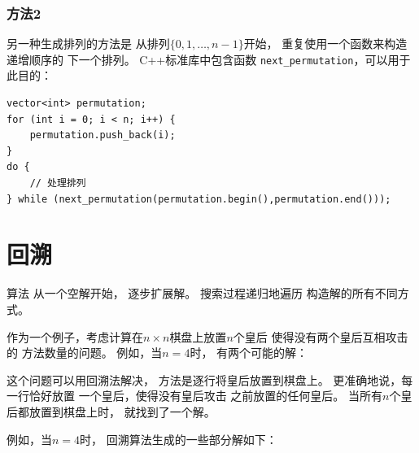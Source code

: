 \subsubsection{方法2}


另一种生成排列的方法是
从排列$\{0,1,\ldots,n-1\}$开始，
重复使用一个函数来构造递增顺序的
下一个排列。
C++标准库中包含函数
\texttt{next\_permutation}，可以用于此目的：

\begin{lstlisting}
vector<int> permutation;
for (int i = 0; i < n; i++) {
    permutation.push_back(i);
}
do {
    // 处理排列
} while (next_permutation(permutation.begin(),permutation.end()));
\end{lstlisting}

\section{回溯}


算法
从一个空解开始，
逐步扩展解。
搜索过程递归地遍历
构造解的所有不同方式。


作为一个例子，考虑计算在$n \times n$棋盘上放置$n$个皇后
使得没有两个皇后互相攻击的
方法数量的问题。
例如，当$n=4$时，
有两个可能的解：

\begin{center}
\end{center}

这个问题可以用回溯法解决，
方法是逐行将皇后放置到棋盘上。
更准确地说，每一行恰好放置
一个皇后，使得没有皇后攻击
之前放置的任何皇后。
当所有$n$个皇后都放置到棋盘上时，
就找到了一个解。

例如，当$n=4$时，
回溯算法生成的一些部分解如下：

